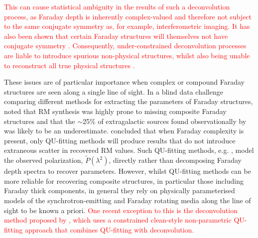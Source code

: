 \documentclass[fleqn,usenatbib]{mnras}
\begin{document}
\textcolor{red}{This  can cause statistical ambiguity in the results of such a deconvolution process, as Faraday depth is inherently complex-valued and therefore not subject to the same conjugate symmetry as, for example, interferometric imaging. It has also been shown that certain Faraday structures will themselves not have conjugate symmetry \citep{Brandenburg_2014}. Consequently, under-constrained deconvolution processes are liable to introduce spurious non-physical structures, whilst also being unable to reconstruct all true physical structures \citep{JP2012,pratley2020}.}


These issues are of particular importance when complex or compound Faraday structures are seen along a single line of sight. In a blind data challenge comparing different methods for extracting the parameters of Faraday structures, \cite{Sun_2015} noted that RM synthesis was highly prone to missing composite Faraday structures and that the $\sim$25\% of extragalactic sources found observationally by \citep{law2011} was likely to be an underestimate. \cite{Sun_2015} concluded that when Faraday complexity is present, only QU-fitting methods will produce results that do not introduce extraneous scatter in recovered RM values. Such QU-fitting methods, e.g. \cite{Farnsworth_2011, 10.1111/j.1365-2966.2012.20554.x, 2014ApJ...792...51I}, model the observed polarization, $\tilde{P}(\lambda^2)$, directly rather than decomposing Faraday depth spectra to recover parameters. However, whilst QU-fitting methods can be more reliable for recovering composite structures, in particular those including Faraday thick components, in general they rely on physically parameterised models of the synchrotron-emitting and Faraday rotating media along the line of sight to be known a priori. \textcolor{red}{One recent exception to this is the deconvolution method proposed by \cite{pratley2020}, which uses a constrained {\sc clean}-style non-parametric QU-fitting approach that combines QU-fitting with deconvolution.}
\end{document}
